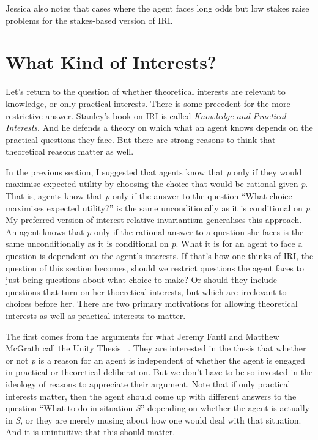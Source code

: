 \documentclass[11pt,oneside]{book}
\begin{document}
Jessica  \citet[176]{Brown2008} also notes that cases where the agent faces long odds but low stakes raise problems for the stakes-based version of IRI.

\section{What Kind of Interests?}
\label{whatkindofinterests}

Let's return to the question of whether theoretical interests are relevant to knowledge, or only practical interests. There is some precedent for the more restrictive answer. Stanley's book on IRI is called \emph{Knowledge and Practical Interests}. And he defends a theory on which what an agent knows depends on the practical questions they face. But there are strong reasons to think that theoretical reasons matter as well.

In the previous section, I suggested that agents know that \emph{p} only if they would maximise expected utility by choosing the choice that would be rational given \emph{p}. That is, agents know that \emph{p} only if the answer to the question ``What choice maximises expected utility?'' is the same unconditionally as it is conditional on \emph{p}. My preferred version of interest-relative invariantism generalises this approach. An agent knows that \emph{p} only if the rational answer to a question she faces is the same unconditionally as it is conditional on \emph{p}. What it is for an agent to face a question is dependent on the agent's interests. If that's how one thinks of IRI, the question of this section becomes, should we restrict questions the agent faces to just being questions about what choice to make? Or should they include questions that turn on her thoeretical interests, but which are irrelevant to choices before her. There are two primary motivations for allowing theoretical interests as well as practical interests to matter.

The first comes from the arguments for what Jeremy Fantl and Matthew McGrath call the Unity Thesis ~\citep[73--6]{FantlMcGrath2009}. They are interested in the thesis that whether or not \emph{p} is a reason for an agent is independent of whether the agent is engaged in practical or theoretical deliberation. But we don't have to be so invested in the ideology of reasons to appreciate their argument. Note that if only practical interests matter, then the agent should come up with different answers to the question ``What to do in situation \emph{S}'' depending on whether the agent is actually in \emph{S}, or they are merely musing about how one would deal with that situation. And it is unintuitive that this should matter.
\end{document}
